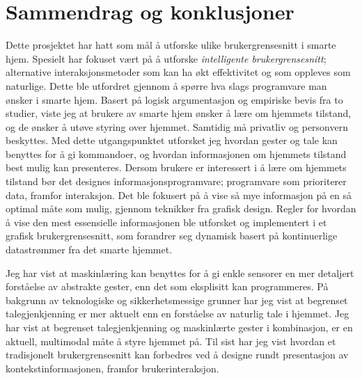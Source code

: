 \section*{Sammendrag og konklusjoner}
Dette prosjektet har hatt som mål å utforske ulike brukergrensesnitt i smarte hjem. Spesielt har fokuset vært på å utforske \emph{intelligente brukergrensesnitt}; alternative interaksjonsmetoder som kan ha økt effektivitet og som oppleves som naturlige. Dette ble utfordret gjennom å spørre hva slags programvare man ønsker i smarte hjem. Basert på logisk argumentasjon og empiriske bevis fra to studier, viste jeg at brukere av smarte hjem ønsker å lære om hjemmets tilstand, og de ønsker å utøve styring over hjemmet. Samtidig må privatliv og personvern beskyttes. Med dette utgangspunktet utforsket jeg hvordan gester og tale kan benyttes for å gi kommandoer, og hvordan informasjonen om hjemmets tilstand best mulig kan presenteres. Dersom brukere er interessert i å lære om hjemmets tilstand bør det designes informasjonsprogramvare; programvare som prioriterer data, framfor interaksjon. Det ble fokusert på å vise så mye informasjon på en så optimal måte som mulig, gjennom teknikker fra grafisk design. Regler for hvordan å vise den mest essensielle informasjonen ble utforsket og implementert i et grafisk brukergrensesnitt, som forandrer seg dynamisk basert på kontinuerlige datastrømmer fra det smarte hjemmet.

Jeg har vist at maskinlæring kan benyttes for å gi enkle sensorer en mer detaljert forståelse av abstrakte gester, enn det som eksplisitt kan programmeres. På bakgrunn av teknologiske og sikkerhetsmessige grunner har jeg vist at begrenset talegjenkjenning er mer aktuelt enn en forståelse av naturlig tale i hjemmet. Jeg har vist at begrenset talegjenkjenning og maskinlærte gester i kombinasjon, er en aktuell, multimodal måte å styre hjemmet på. Til sist har jeg vist hvordan et tradisjonelt brukergrensesnitt kan forbedres ved å designe rundt presentasjon av kontekstinformasjonen, framfor brukerinteraksjon.